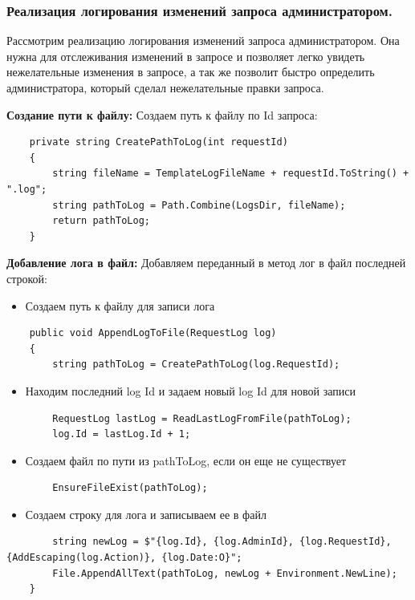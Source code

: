 \subsubsection{Реализация логирования изменений запроса администратором.}

Рассмотрим реализацию логирования изменений запроса администратором. Она нужна для отслеживания изменений в запросе и позволяет легко увидеть нежелательные изменения в запросе, а так же позволит быстро определить администратора, который сделал нежелательные правки запроса.

\textbf{Создание пути к файлу:} Создаем путь к файлу по Id запроса:
\begin{verbatim}
    private string CreatePathToLog(int requestId)
    {
        string fileName = TemplateLogFileName + requestId.ToString() + ".log";
        string pathToLog = Path.Combine(LogsDir, fileName);
        return pathToLog;
    }
\end{verbatim}

\textbf{Добавление лога в файл:} Добавляем переданный в метод лог в файл последней строкой:
\begin{itemize}
	\item{Создаем путь к файлу для записи лога}
\end{itemize}
\begin{verbatim}
    public void AppendLogToFile(RequestLog log)
    {
        string pathToLog = CreatePathToLog(log.RequestId);
\end{verbatim}
\begin{itemize}
	\item{Находим последний log Id и задаем новый log Id для новой записи}
\end{itemize}
\begin{verbatim}
        RequestLog lastLog = ReadLastLogFromFile(pathToLog);
        log.Id = lastLog.Id + 1;
\end{verbatim}

\begin{itemize}
	\item{Создаем файл по пути из pathToLog, если он еще не существует}
\end{itemize}
\begin{verbatim}
        EnsureFileExist(pathToLog);
\end{verbatim}

\begin{itemize}
	\item{Создаем строку для лога и записываем ее в файл}
\end{itemize}
\begin{verbatim}
        string newLog = $"{log.Id}, {log.AdminId}, {log.RequestId}, {AddEscaping(log.Action)}, {log.Date:O}";
        File.AppendAllText(pathToLog, newLog + Environment.NewLine);
    }
\end{verbatim}

